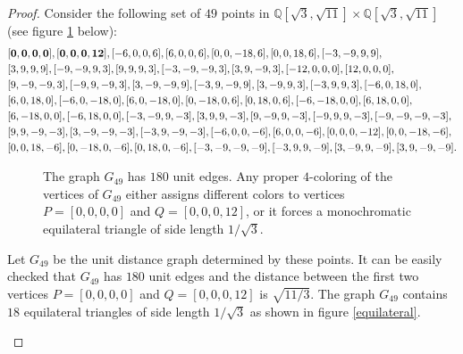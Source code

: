 \documentclass [11pt,oneside]{amsart}
\theoremstyle{definition}
\theoremstyle{plain}
\begin{document}
\begin{proof}
Consider the following set of $49$ points in $\mathbb{Q}[\sqrt{3}, \sqrt{11}]\times \mathbb{Q}[\sqrt{3}, \sqrt{11}]$ (see figure \ref{G49drawing} below):
{
\begin{align*}
&{\bf [0, 0, 0, 0], [0, 0, 0, 12]}, [-6, 0, 0, 6], [6, 0, 0, 6], [0, 0, -18, 6], [0, 0, 18, 6], [-3, -9, 9, 9], \\
&[3, 9, 9, 9], [-9, -9, 9, 3], [9, 9, 9, 3], [-3, -9, -9, 3], [3, 9, -9, 3], [-12, 0, 0, 0], [12, 0, 0, 0],\\
&[9, -9, -9, 3], [-9, 9, -9, 3], [3, -9, -9, 9], [-3, 9, -9, 9], [3, -9, 9, 3], [-3, 9, 9, 3], [-6, 0, 18, 0],\\
&[6, 0, 18, 0], [-6, 0, -18, 0], [6, 0, -18, 0], [0, -18, 0, 6], [0, 18, 0, 6], [-6, -18, 0, 0], [6, 18, 0, 0],\\
&[6, -18, 0, 0], [-6, 18, 0, 0], [-3, -9, 9, -3], [3, 9, 9, -3], [9, -9, 9, -3], [-9, 9, 9, -3], [-9, -9, -9, -3],\\
&[9, 9, -9, -3], [3, -9, -9, -3], [-3, 9, -9, -3], [-6, 0, 0, -6], [6, 0, 0, -6], [0, 0, 0, -12], [0, 0, -18, -6],\\
&[0, 0, 18, -6], [0, -18, 0, -6], [0, 18, 0, -6], [-3, -9, -9, -9], [-3, 9, 9, -9], [3, -9, 9, -9], [3, 9, -9, -9].
\end{align*}
}
\begin{figure}[ht]
\centering
{}
\vspace{2mm}
\caption{The graph $G_{49}$ has $180$ unit edges. Any proper $4$-coloring of the vertices of $G_{49}$ either assigns different colors to vertices $P=[0,0,0,0]$ and $Q=[0,0,0,12]$, or it forces a monochromatic equilateral triangle of side length $1/\sqrt{3}$.}
\label{G49drawing}
\end{figure}

Let $G_{49}$ be the unit distance graph determined by these points. It can be easily checked that $G_{49}$ has $180$ unit edges and the distance between the first two vertices $P=[0,0,0,0]$ and $Q=[0,0,0,12]$ is $\sqrt{11/3}$. The graph $G_{49}$ contains $18$ equilateral triangles of side length $1/\sqrt{3}$ as shown in figure \ref{equilateral}.

\begin{figure}[ht]
\centering


\end{figure}
\end{proof}
\end{document}
